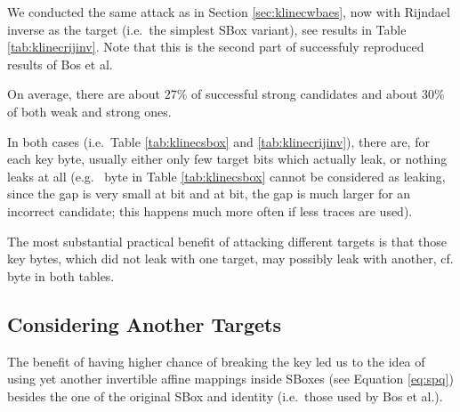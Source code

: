 	We conducted the same attack as in Section \ref{sec:klinecwbaes}, now with Rijndael inverse as the target (i.e.\ the simplest SBox variant), see results in Table \ref{tab:klinecrijinv}. Note that this is the second part of successfuly reproduced results of Bos et al.
	
	
	On average, there are about $27\%$ of successful strong candidates and about $30\%$ of both weak and strong ones.
	
	In both cases (i.e.\ Table \ref{tab:klinecsbox} and \ref{tab:klinecrijinv}), there are, for each key byte, usually either only few target bits which actually leak, or nothing leaks at all (e.g.\  byte in Table \ref{tab:klinecsbox} cannot be considered as leaking, since the gap is very small at  bit and at  bit, the gap is much larger for an incorrect candidate; this happens much more often if less traces are used).
	
	The most substantial practical benefit of attacking different targets is that those key bytes, which did not leak with one target, may possibly leak with another, cf.  byte in both tables.



\subsection{Considering Another Targets}
\label{sec:16targets}

The benefit of having higher chance of breaking the key led us to the idea of using yet another invertible affine mappings inside SBoxes (see Equation \ref{eq:spq}) besides the one of the original SBox and identity (i.e.\ those used by Bos et al.).

